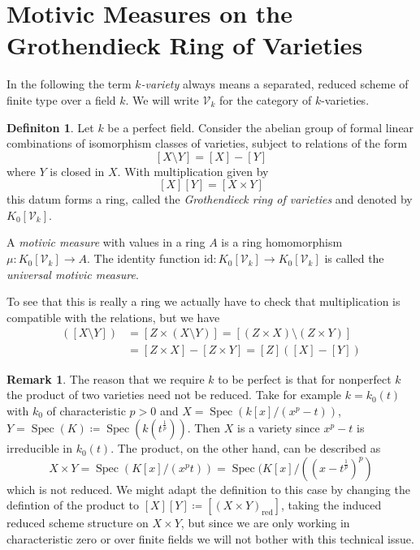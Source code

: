 \documentclass[11pt, a4paper, german]{article}
\theoremstyle{plain}
\theoremstyle{definition}
\newtheorem{definition}[theorem]{Definiton}
\newtheorem{remark}[theorem]{Remark}
\newcommand{\gring}[1][k]{K_0[\mathcal{V}_#1]}
\DeclareMathOperator{\Spec}{Spec}
\begin{document}
\section{Motivic Measures on the Grothendieck Ring of Varieties}
\label{sec1}
In the following the term \emph{$k$-variety} always means a separated, reduced scheme of finite type over a field $k$.
We will write $\mathcal{V}_k$ for the category of $k$-varieties. 

\begin{definition}
    \label{gringdef}
    Let $k$ be a perfect field. 
    Consider the abelian group of formal linear combinations of isomorphism classes of varieties, subject to relations of the form
    \[
        [X \setminus Y] = [X] - [Y]
    \] where $Y$ is closed in $X$.
    With multiplication given by
    \[
        [X][Y] = [X \times Y]
    \]
    this datum forms a ring, called the \emph{Grothendieck ring of varieties} and denoted by $\gring$. 
    
    A \emph{motivic measure} with values in a ring $A$ is a ring homomorphism $\mu \colon \gring \to A$. The identity function
    $\mathrm{id} \colon \gring \to \gring$ is called the \emph{universal motivic measure}.
\end{definition}

To see that this is really a ring we actually have to check that multiplication is compatible with the relations, but we have
\begin{align*}
    [Z] ([X \setminus Y])   &= [Z \times (X \setminus Y)] = [(Z \times X) \setminus (Z \times Y)] \\
                            &= [Z \times X] - [Z \times Y] = [Z]([X] - [Y])
\end{align*} 

\begin{remark}
The reason that we require $k$ to be perfect is that for nonperfect $k$ the product of two varieties need not be reduced. Take for example
$k = k_0(t)$ with $k_0$ of characteristic $p > 0$ and $X = \Spec(k[x]/(x^p - t))$, $Y = \Spec(K) \coloneqq \Spec(k(t^{\frac{1}{p}}))$. 
Then $X$ is a variety since $x^p - t$ is irreducible in $k_0(t)$. The product, on the other hand, can be described as
    \[
        X \times Y = \Spec(K[x]/(x^p t)) = \Spec(K[x]/((x-t^{\frac{1}{p}})^p)
    \]
which is not reduced. We might adapt the definition to this case by changing the defintion of the product to 
$[X][Y] \coloneqq [(X \times Y)_{\text{red}}]$, taking the induced reduced scheme structure on $X \times Y$, but since we are only working
in characteristic zero or over finite fields we will not bother with this technical issue.
\end{remark}
\end{document}
